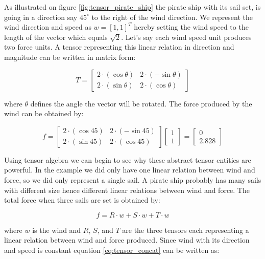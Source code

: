 As illustrated on figure \vref{fig:tensor_pirate_ship} the pirate ship with its sail set, is
going in a direction say $45^\circ$ to the right of the wind
direction. We represent the wind direction and speed as $w =
[1,1]^T$ hereby setting the wind speed to the length of the vector
which equals $\sqrt{2}$. Let's say each wind speed unit produces two force 
units. A tensor representing this linear relation in direction and
magnitude can be written in matrix form:

\begin{equation}
T = \begin{bmatrix} 
2 \cdot (\cos \theta) & 2 \cdot (-\sin \theta) \\ 
2 \cdot (\sin \theta) & 2 \cdot (\cos \theta) 
\end{bmatrix} 
\end{equation}

where $\theta$ defines the angle the vector will be rotated.
The force produced by the wind can be obtained by:

\begin{equation}
f = 
\begin{bmatrix} 
2 \cdot (\cos 45) & 2 \cdot (-\sin 45) \\ 
2 \cdot (\sin 45) & 2 \cdot (\cos 45) 
\end{bmatrix} 
\begin{bmatrix} 
1 \\ 1
\end{bmatrix} 
=
\begin{bmatrix}
0 \\ 2.828 
\end{bmatrix} 
\end{equation}

Using tensor algebra we can begin to see why these abstract tensor
entities are powerful. In the example we did only have one linear
relation between wind and force, so we did only represent a single sail. A pirate ship
probably has many sails with different size hence different linear
relations between wind and force. The total force when three sails are
set is obtained by:

\begin{equation}
\label{eq:tensor_concat}
f = R \cdot w + S \cdot w + T \cdot w
\end{equation}

where $w$ is the wind and $R$, $S$, and $T$ are the three tensors each representing a linear
relation between wind and force produced.
Since wind with its direction and speed is constant equation
\eqref{eq:tensor_concat} can be written as:

